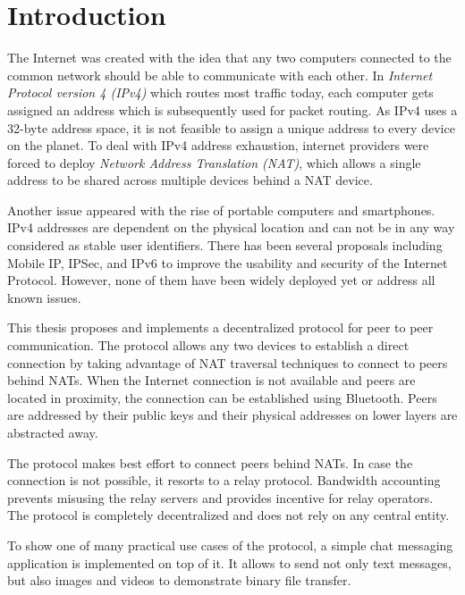 \chapter{Introduction}

The Internet was created with the idea that any two computers connected to the common network should be able to communicate with each other. In \textit{Internet Protocol version 4 (IPv4)} which routes most traffic today, each computer gets assigned an address which is subsequently used for packet routing. As IPv4 uses a 32-byte address space, it is not feasible to assign a unique address to every device on the planet. To deal with IPv4 address exhaustion, internet providers were forced to deploy \textit{Network Address Translation (NAT)}, which allows a single address to be shared across multiple devices behind a NAT device.

Another issue appeared with the rise of portable computers and smartphones. IPv4 addresses are dependent on the physical location and can not be in any way considered as stable user identifiers. There has been several proposals including Mobile IP, IPSec, and IPv6 to improve the usability and security of the Internet Protocol. However, none of them have been widely deployed yet or address all known issues.

This thesis proposes and implements a decentralized protocol for peer to peer communication. The protocol allows any two devices to establish a direct connection by taking advantage of NAT traversal techniques to connect to peers behind NATs. When the Internet connection is not available and peers are located in proximity, the connection can be established using Bluetooth. Peers are addressed by their public keys and their physical addresses on lower layers are abstracted away.

The protocol makes best effort to connect peers behind NATs. In case the connection is not possible, it resorts to a relay protocol. Bandwidth accounting prevents misusing the relay servers and provides incentive for relay operators. The protocol is completely decentralized and does not rely on any central entity.


To show one of many practical use cases of the protocol, a simple chat messaging application is implemented on top of it. It allows to send not only text messages, but also images and videos to demonstrate binary file transfer.

